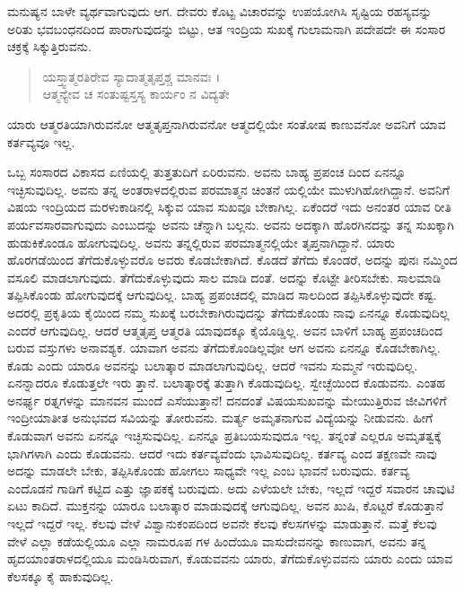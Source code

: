 ಮನುಷ್ಯನ ಬಾಳೇ ವ್ಯರ್ಥವಾಗುವುದು ಆಗ. ದೇವರು ಕೊಟ್ಟ ವಿಚಾರವನ್ನು ಉಪಯೋಗಿಸಿ ಸೃಷ್ಟಿಯ ರಹಸ್ಯವನ್ನು ಅರಿತು ಭವಬಂಧನದಿಂದ ಪಾರಾಗುವುದನ್ನು ಬಿಟ್ಟು, ಆತ ಇಂದ್ರಿಯ ಸುಖಕ್ಕೆ ಗುಲಾಮನಾಗಿ ಪದೇಪದೇ ಈ ಸಂಸಾರ ಚಕ್ರಕ್ಕೆ ಸಿಕ್ಕುತ್ತಿರುವನು.

\begin{verse}
ಯಸ್ತ್ವಾತ್ಮರತಿರೇವ ಸ್ಯಾದಾತ್ಮತೃಪ್ತಶ್ಚ ಮಾನವಃ ।\\ಆತ್ಮನ್ಯೇವ ಚ ಸಂತುಷ್ಟಸ್ತಸ್ಯ ಕಾರ್ಯಂ ನ ವಿದ್ಯತೇ 
\end{verse}

{\small ಯಾರು ಆತ್ಮರತಿಯಾಗಿರುವನೋ ಆತ್ಮತೃಪ್ತನಾಗಿರುವನೋ ಆತ್ಮದಲ್ಲಿಯೇ ಸಂತೋಷ ಕಾಣುವನೋ ಅವನಿಗೆ ಯಾವ ಕರ್ತವ್ಯವೂ ಇಲ್ಲ.}

ಒಬ್ಬ ಸಂಸಾರದ ವಿಕಾಸದ ಏಣಿಯಲ್ಲಿ ತುತ್ತತುದಿಗೆ ಏರಿರುವನು. ಅವನು ಬಾಹ್ಯ ಪ್ರಪಂಚ ದಿಂದ ಏನನ್ನೂ ಇಚ್ಛಿಸುವುದಿಲ್ಲ. ಅವನು ತನ್ನ ಅಂತರಾಳದಲ್ಲಿರುವ ಪರಮಾತ್ಮನ ಚಿಂತನೆ ಯಲ್ಲಿಯೇ ಮುಳುಗಿಹೋಗಿದ್ದಾನೆ. ಅವನಿಗೆ ವಿಷಯ ಇಂದ್ರಿಯದ ಮರಳುಕಾಡಿನಲ್ಲಿ ಸಿಕ್ಕುವ ಯಾವ ಸುಖವೂ ಬೇಕಾಗಿಲ್ಲ. ಏಕೆಂದರೆ ಇದು ಅನಂತರ ಯಾವ ರೀತಿ ಪರ್ಯವಸಾರವಾಗುವುದು ಎಂಬುದನ್ನು ಅವನು ಚೆನ್ನಾಗಿ ಬಲ್ಲನು. ಅವನು ಅದಕ್ಕಾಗಿ ಹೊರಗಿನದನ್ನು ತನ್ನ ಸುಖಕ್ಕಾಗಿ ಹುಡುಕಿಕೊಂಡೂ ಹೋಗುವುದಿಲ್ಲ. ಅವನು ತನ್ನಲ್ಲಿರುವ ಪರಮಾತ್ಮನಲ್ಲಿಯೇ ತೃಪ್ತನಾಗಿದ್ದಾನೆ. ಯಾರು ಹೊರಗಡೆಯಿಂದ ತೆಗೆದುಕೊಳ್ಳುವರೊ ಅವರು ಕೊಡಬೇಕಾಗಿದೆ. ಕೊಡದೆ ತೆಗೆದು ಕೊಂಡರೆ, ಅದನ್ನು ಪುನಃ ನಮ್ಮಿಂದ ವಸೂಲಿ ಮಾಡಲಾಗುವುದು. ತೆಗೆದುಕೊಳ್ಳುವುದು ಸಾಲ ಮಾಡಿ ದಂತೆ. ಅದನ್ನು ಕೊಟ್ಟೇ ತೀರಿಸಬೇಕು. ಸಾಲಮಾಡಿ ತಪ್ಪಿಸಿಕೊಂಡು ಹೋಗುವುದಕ್ಕೆ ಆಗುವುದಿಲ್ಲ. ಬಾಹ್ಯ ಪ್ರಪಂಚದಲ್ಲಿ ಮಾಡಿದ ಸಾಲದಿಂದ ತಪ್ಪಿಸಿಕೊಳ್ಳುವುದೇ ಕಷ್ಟ. ಅದರಲ್ಲಿ ಪ್ರಕೃತಿಯ ಕೈಯಿಂದ ನಮ್ಮ ಸುಖಕ್ಕೆ ಬರಬೇಕಾಗಿರುವುದನ್ನು ತೆಗೆದುಕೊಂಡು ನಾವು ಏನನ್ನೂ ಕೊಡುವುದಿಲ್ಲ ಎಂದರೆ ಆಗುವುದಿಲ್ಲ. ಆದರೆ ಆತ್ಮತೃಪ್ತ ಆತ್ಮರತಿ ಯಾವುದಕ್ಕೂ ಕೈಯೊಡ್ಡಿಲ್ಲ. ಅವನ ಬಾಳಿಗೆ ಬಾಹ್ಯ ಪ್ರಪಂಚದಿಂದ ಬರುವ ವಸ್ತುಗಳು ಅನಾವಶ್ಯಕ. ಯಾವಾಗ ಅವನು ತೆಗೆದುಕೊಂಡಿಲ್ಲವೋ ಆಗ ಅವನು ಏನನ್ನೂ ಕೊಡಬೇಕಾಗಿಲ್ಲ. ಕೊಡು ಎಂದು ಯಾರೂ ಅವನನ್ನು ಬಲಾತ್ಕಾರ ಮಾಡಲಾಗುವುದಿಲ್ಲ. ಆದರೆ ಇವನು ಸುಮ್ಮನೆ ಇರುವುದಿಲ್ಲ. ಏನನ್ನಾದರೂ ಕೊಡುತ್ತಲೇ ಇರು ತ್ತಾನೆ. ಬಲಾತ್ಕಾರಕ್ಕೆ ತುತ್ತಾಗಿ ಕೊಡುವುದಿಲ್ಲ. ಸ್ವೇಚ್ಛೆಯಿಂದ ಕೊಡುವನು. ಎಂತಹ ಅನರ್ಘ್ಯ ರತ್ನಗಳನ್ನು ಮಾನವನ ಮುಂದೆ ಎಸೆಯುತ್ತಾನೆ! ದನದಂತೆ ವಿಷಯಸುಖವನ್ನು ಮೇಯುತ್ತಿರುವ ಜೀವಿಗಳಿಗೆ ಇಂದ್ರೀಯಾತೀತ ಅನುಭವದ ಸವಿಯನ್ನು ತೋರುವನು. ಮರ್ತ್ಯ ಅಮೃತನಾಗುವ ವಿದ್ಯೆಯನ್ನು ನೀಡುವನು. ಹೀಗೆ ಕೊಡುವಾಗ ಅವನು ಏನನ್ನೂ ಇಚ್ಛಿಸುವುದಿಲ್ಲ. ಏನನ್ನೂ ಪ್ರತಿಬಯಸುವುದೂ ಇಲ್ಲ. ತನ್ನಂತೆ ಎಲ್ಲರೂ ಅಮೃತತ್ವಕ್ಕೆ ಭಾಗಿಗಳಾಗಿ ಎಂದು ಕೊಡುವನು. ಆದರೆ ಇದು ಕರ್ತವ್ಯವೆಂದು ಭಾವಿಸುವುದಿಲ್ಲ. ಕರ್ತವ್ಯ ಎಂದ ತಕ್ಷಣವೇ ನಾವು ಅದನ್ನು ಮಾಡಲೇ ಬೇಕು, ತಪ್ಪಿಸಿಕೊಂಡು ಹೋಗಲು ಸಾಧ್ಯವೇ ಇಲ್ಲ ಎಂಬ ಭಾವನೆ ಬರುವುದು. ಕರ್ತವ್ಯ ಎಂದೊಡನೆ ಗಾಡಿಗೆ ಕಟ್ಟಿದ ಎತ್ತು ಜ್ಞಾಪಕಕ್ಕೆ ಬರುವುದು. ಅದು ಎಳೆಯಲೇ ಬೇಕು, ಇಲ್ಲದೆ ಇದ್ದರೆ ಸವಾರನ ಚಾವುಟಿ ಏಟು ಕಾದಿದೆ. ಮುಕ್ತನನ್ನು ಯಾರೂ ಬಲಾತ್ಕಾರ ಮಾಡುವುದಕ್ಕೆ ಆಗುವುದಿಲ್ಲ. ಅವನ ಖುಷಿ, ಕೊಟ್ಟರೆ ಕೊಡುತ್ತಾನೆ ಇಲ್ಲದೆ ಇದ್ದರೆ ಇಲ್ಲ. ಕೆಲವು ವೇಳೆ ವಿಶ್ವಾನುಕಂಪದಿಂದ ಅವನೇ ಕೆಲವು ಕೆಲಸಗಳನ್ನು ಮಾಡುತ್ತಾನೆ. ಮತ್ತೆ ಕೆಲವು ವೇಳೆ ಎಲ್ಲಾ ಕಡೆಯಲ್ಲಿಯೂ ಎಲ್ಲಾ ನಾಮರೂಪ ಗಳ ಹಿಂದೆಯೂ ವಾಸುದೇವನನ್ನು ಕಾಣುವಾಗ, ಅವನು ತನ್ನ ಹೃದಯಾಂತರಾಳದಲ್ಲಿಯೂ ಮಂಡಿಸಿರುವಾಗ, ಕೊಡುವವನು ಯಾರು, ತೆಗೆದುಕೊಳ್ಳುವವನು ಯಾರು ಎಂದು ಯಾವ ಕೆಲಸಕ್ಕೂ ಕೈ ಹಾಕುವುದಿಲ್ಲ.

